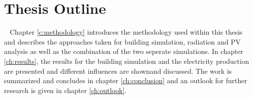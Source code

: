 \section{Thesis Outline}\
	Chapter \ref{c:methodology} introduces the methodology used within this thesis and describes the approaches taken for building simulation, radiation and PV analysis as well as the combination of the two seperate simulations. In chapter \ref{ch:results}, the results for the building simulation and the electricity production are presented and different influences are shownand discussed. The work is summarized and concludes in chapter \ref{ch:conclusion} and an outlook for further research is given in chapter \ref{ch:outlook}. 

